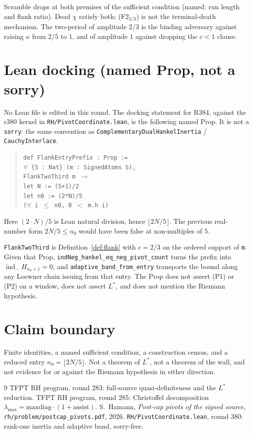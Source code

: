 \documentclass[11pt]{article}
\theoremstyle{remark}
\newcommand{\indm}{\operatorname{ind}_{-}}
\begin{document}
Scramble drops at both premises of the sufficient condition
(named: run length and flank ratio).  Dead $\chi$ satisfy both;
(F2$_{2/3}$) is not the terminal-death mechanism.  The
two-period of amplitude $2/3$ is the binding adversary against
raising $\kappa$ from $2/5$ to $1$, and of amplitude $1$ against
dropping the $c<1$ clause.

\section{Lean docking (named Prop, not a sorry)}\label{sec:lean}

No Lean file is edited in this round.  The docking statement for
R384, against the r380 kernel in \texttt{RH/PivotCoordinate.lean},
is the following named Prop.  It is not a \texttt{sorry}: the
same convention as \texttt{ComplementaryDualHankelInertia} /
\texttt{CauchyInterlace}.

\begin{quote}
\texttt{def FlankEntryPrefix : Prop :=}\\
\quad\texttt{$\forall$ \{S : Nat\} (m : SignedAtoms S),}\\
\quad\texttt{\quad FlankTwoThird m $\to$}\\
\quad\texttt{\quad let N := (S+1)/2}\\
\quad\texttt{\quad let n0 := (2*N)/5}\\
\quad\texttt{\quad ($\forall$ i $\le$ n0, 0 $<$ m.h i)}
\end{quote}
Here $(2\cdot N)/5$ is Lean natural division, hence
$\lfloor 2N/5\rfloor$.  The previous real-number form
$2N/5\le n_0$ would have been false at non-multiples of $5$.

\texttt{FlankTwoThird} is Definition~\ref{def:flank} with
$c=2/3$ on the ordered support of \texttt{m}.  Given that Prop,
\texttt{indNeg\_hankel\_eq\_neg\_pivot\_count} turns the prefix
into $\indm H_{n_0+1}=0$, and \texttt{adaptive\_band\_from\_entry}
transports the bound along any Loewner chain issuing from that
entry.  The Prop does not assert (P1) or (P2) on a window, does
not assert $L^*$, and does not mention the Riemann hypothesis.

\section*{Claim boundary}

Finite identities, a named sufficient condition, a construction
census, and a reduced entry $n_0=\lfloor 2N/5\rfloor$.  Not a
theorem of $L^*$, not a theorem of the wall, and not evidence
for or against the Riemann hypothesis in either direction.

\begin{thebibliography}{9}
TFPT RH program, round 283: full-source quasi-definiteness and
the $L^*$ reduction.
TFPT RH program, round 285: Christoffel decomposition
$\lambda_{\max}=\mathrm{maxdiag}\cdot(1+\mathrm{assist})$.
S.~Hamann, \emph{Post-cap pivots of the signed source},
\texttt{rh/problem/postcap\_pivots.pdf}, 2026.
\texttt{RH/PivotCoordinate.lean}, round 380: rank-one inertia
and adaptive band, sorry-free.
\end{thebibliography}
\end{document}

